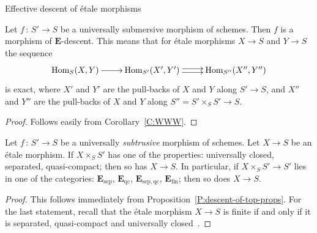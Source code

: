 \documentclass[a4paper,twoside,11pt]{amsart}[2009/07/02] %
\newcommand{\pref}[1]{\eqref{#1}}
\DeclareMathOperator{\Hom}{Hom}
\newcommand{\map}[3]{#1\,:\, #2\rightarrow #3}
\newcommand{\etale}{\'{e}tale}
\newcommand{\sep}{\mathrm{sep}}
\newcommand{\catE}{\mathbf{E}}
\newcommand{\qc}{\mathrm{qc}}
\newcommand{\finite}{\mathrm{fin}}
\begin{document}
\begin{section}{Effective descent of \etale{} morphisms}
\begin{proposition}
\label{P:univ-sub-is-m.o.d.}
Let $\map{f}{S'}{S}$ be a universally submersive morphism of schemes. Then $f$
is a morphism of $\catE$-descent. This means that for \etale{} morphisms $X\to
S$ and $Y\to S$ the sequence
%
$$\xymatrix{
\Hom_S(X,Y)\ar[r] & \Hom_{S'}(X',Y')\ar@<.5ex>[r]\ar@<-.5ex>[r]
 & \Hom_{S''}(X'',Y'')}$$
%
is exact, where $X'$ and $Y'$ are the pull-backs of $X$ and $Y$ along $S'\to
S$, and $X''$ and $Y''$ are the pull-backs of $X$ and $Y$ along $S''=S'\times_S
S'\to S$.
\end{proposition}
\begin{proof}
Follows easily from Corollary~\pref{C:WWW}.
\end{proof}

\begin{proposition}
Let $\map{f}{S'}{S}$ be a universally \emph{subtrusive} morphism of schemes.
Let $X\to S$ be an \etale{} morphism. If $X\times_S S'$ has one of the
properties: universally closed, separated, quasi-compact; then so has
$X\to S$. In particular, if $X\times_S S'\to S'$ lies in one of the categories:
$\catE_{\sep}$, $\catE_{\qc}$, $\catE_{\sep,\qc}$, $\catE_{\finite}$; then so
does $X\to S$.
\end{proposition}
\begin{proof}
This follows immediately from Proposition~\pref{P:descent-of-top-props}. For
the last statement, recall that the \etale{} morphism $X\to S$ is finite if and
only if it is separated, quasi-compact and universally
closed~\cite[Thm.~8.11.1]{egaIV}.
\end{proof}


\end{section}
\end{document}
